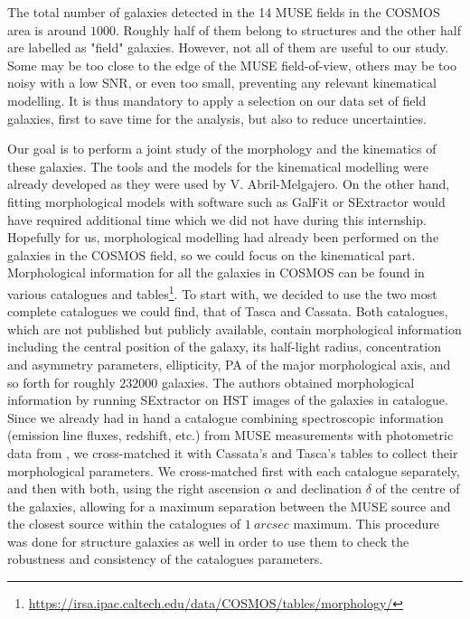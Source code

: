 The total number of galaxies detected in the 14 MUSE fields in the COSMOS area is around $1000$. Roughly half of them belong to structures and the other half are labelled as "field" galaxies. However, not all of them are useful to our study. Some may be too close to the edge of the MUSE field-of-view, others may be too noisy with a low SNR, or even too small, preventing any relevant kinematical modelling. It is thus mandatory to apply a selection on our data set of field galaxies, first to save time for the analysis, but also to reduce uncertainties.

Our goal is to perform a joint study of the morphology and the kinematics of these galaxies. The tools and the models for the kinematical modelling were already developed as they were used by V. Abril-Melgajero. On the other hand, fitting morphological models with software such as GalFit or SExtractor would have required additional time which we did not have during this internship. Hopefully for us, morphological modelling had already been performed on the galaxies in the COSMOS field, so we could focus on the kinematical part. \\

Morphological information for all the galaxies in COSMOS can be found in various catalogues and tables\footnote{\url{https://irsa.ipac.caltech.edu/data/COSMOS/tables/morphology/}}. To start with, we decided to use the two most complete catalogues we could find, that of Tasca and Cassata. Both catalogues, which are not published but publicly available, contain morphological information including the central position of the galaxy, its half-light radius, concentration and asymmetry parameters, ellipticity, PA of the major morphological axis, and so forth for roughly $232 000$ galaxies. The authors obtained morphological information by running SExtractor on HST images of the galaxies in  catalogue. \\

Since we already had in hand a catalogue combining spectroscopic information (emission line fluxes, redshift, etc.) from MUSE measurements with photometric data from , we cross-matched it with Cassata's and Tasca's tables to collect their morphological parameters. We cross-matched first with each catalogue separately, and then with both, using the right ascension $\alpha$ and declination $\delta$ of the centre of the galaxies, allowing for a maximum separation between the MUSE source and the closest source within the catalogues of $\SI{1}{arcsec}$ maximum. This procedure was done for structure galaxies as well in order to use them to check the robustness and consistency of the catalogues parameters.

